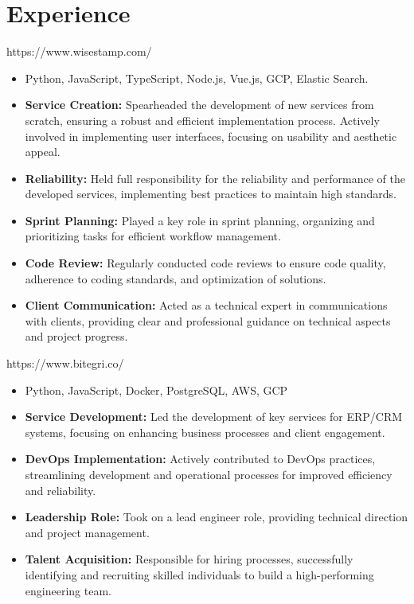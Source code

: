 \documentclass{resume}
\begin{document}



\section{Experience}


https://www.wisestamp.com/
\begin{itemize}
  \item Python, JavaScript, TypeScript, Node.js, Vue.js, GCP, Elastic Search.
  \item \textbf{Service Creation:} Spearheaded the development of new services from scratch, ensuring a robust and efficient implementation process. Actively involved in implementing user interfaces, focusing on usability and aesthetic appeal.
  \item \textbf{Reliability:} Held full responsibility for the reliability and performance of the developed services, implementing best practices to maintain high standards.
  \item \textbf{Sprint Planning:} Played a key role in sprint planning, organizing and prioritizing tasks for efficient workflow management.
  \item \textbf{Code Review:} Regularly conducted code reviews to ensure code quality, adherence to coding standards, and optimization of solutions.
  \item \textbf{Client Communication:} Acted as a technical expert in communications with clients, providing clear and professional guidance on technical aspects and project progress.
\end{itemize}


https://www.bitegri.co/
\begin{itemize}
  \item Python, JavaScript, Docker, PostgreSQL, AWS, GCP
  \item \textbf{Service Development:} Led the development of key services for ERP/CRM systems, focusing on enhancing business processes and client engagement.
  \item \textbf{DevOps Implementation:} Actively contributed to DevOps practices, streamlining development and operational processes for improved efficiency and reliability.
  \item \textbf{Leadership Role:} Took on a lead engineer role, providing technical direction and project management.
  \item \textbf{Talent Acquisition:} Responsible for hiring processes, successfully identifying and recruiting skilled individuals to build a high-performing engineering team.
\end{itemize}
\end{document}
